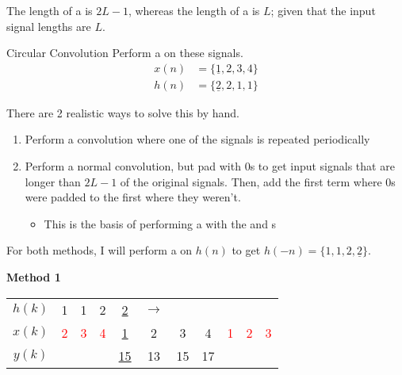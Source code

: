 \begin{definition}
  \begin{remark}
    The length of a  is $2L-1$, whereas the length of a  is $L$; given that the input signal lengths are $L$.
  \end{remark}
\end{definition}

\begin{example}{Circular Convolution}
  Perform a  on these signals.
  \begin{align*}
    x(n) &= \lbrace \underline{1}, 2, 3, 4 \rbrace \\
    h(n) &= \lbrace \underline{2}, 2, 1, 1 \rbrace
  \end{align*}

  \tcblower{}

  There are 2 realistic ways to solve this by hand.
  \begin{enumerate}[noitemsep]
  \item Perform a convolution where one of the signals is repeated periodically
  \item Perform a normal convolution, but pad with 0s to get input signals that are longer than $2L-1$ of the original signals. Then, add the first term where 0s were padded to the first where they weren't.
    \begin{itemize}[noitemsep]
    \item This is the basis of performing a  with the  and s
    \end{itemize}
  \end{enumerate}

  For both methods, I will perform a  on $h(n)$ to get $h(-n) = \lbrace 1, 1, 2, \underline{2} \rbrace$.

  \textbf{Method 1} \\
  \begin{center}
    \begin{tabular}{ccccccccccc}
      \toprule
      $h(k)$ & 1 & 1 & 2 & \underline{2} & $\rightarrow$ & & & & & \\
      $x(k)$ & \textcolor{red}{2} & \textcolor{red}{3} & \textcolor{red}{4} & \underline{1} & 2 & 3 & 4 & \textcolor{red}{1} & \textcolor{red}{2} & \textcolor{red}{3} \\
      \midrule
      $y(k)$ & & & & \underline{15} & 13 & 15 & 17 & & \\
      \bottomrule
    \end{tabular}
  \end{center}


\end{example}
